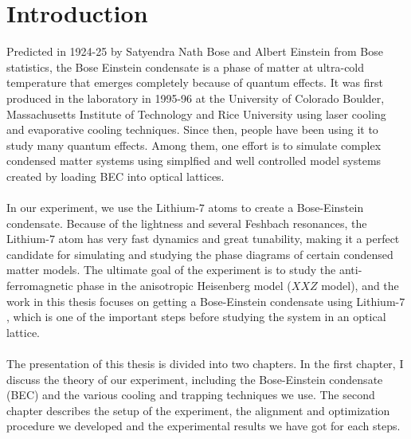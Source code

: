 \chapter{Introduction}

Predicted in 1924-25 by Satyendra Nath Bose and Albert Einstein from Bose statistics, the Bose Einstein condensate is a phase of matter at ultra-cold temperature that emerges completely because of quantum effects. It was first produced in the laboratory in 1995-96 at the University of Colorado Boulder, Massachusetts Institute of Technology and Rice University using laser cooling and evaporative cooling techniques. Since then, people have been using it to study many quantum effects. Among them, one effort is to simulate complex condensed matter systems using simplfied and well controlled model systems created by loading BEC into optical lattices.\\
\\
In our experiment, we use the Lithium-$7$ atoms to create a Bose-Einstein condensate. Because of the lightness and several Feshbach resonances, the Lithium-$7$ atom has very fast dynamics and great tunability, making it a perfect candidate for simulating and studying the phase diagrams of certain condensed matter models. The ultimate goal of the experiment is to study the anti-ferromagnetic phase in the anisotropic Heisenberg model ($XXZ$ model), and the work in this thesis focuses on getting a Bose-Einstein condensate using Lithium-$7$, which is one of the important steps before studying the system in an optical lattice.\\
\\
The presentation of this thesis is divided into two chapters. In the first chapter, I discuss the theory of our experiment, including the Bose-Einstein condensate (BEC) and the various cooling and trapping techniques we use. The second chapter describes the setup of the experiment, the alignment and optimization procedure we developed and the experimental results we have got for each steps.
